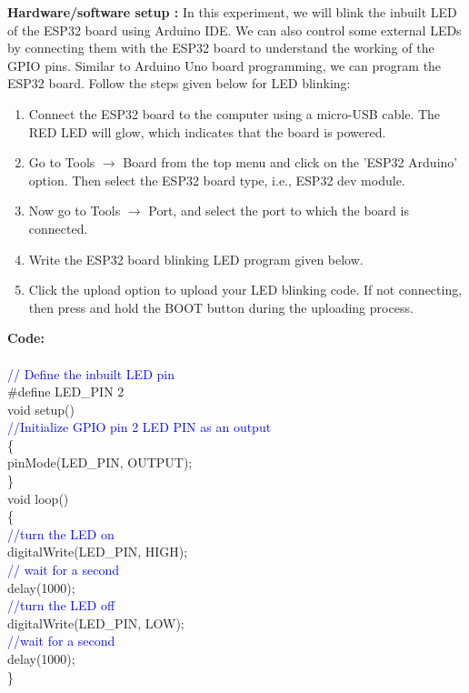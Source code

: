 \documentclass[12pt,a4paper]{article}
\begin{document}
\setlength{\parindent}{0eM}
\textbf{Hardware/software setup :} In this experiment, we will blink the inbuilt LED of the ESP32 board using Arduino IDE. We can also control some external LEDs by connecting them with the ESP32 board to understand the working of the GPIO pins. Similar to Arduino Uno board programming, we can program the ESP32 board.
Follow the steps given below for LED blinking:
\begin{enumerate}
 \setlength\itemsep{-0.3em}
 
\item {Connect the ESP32 board to the computer using a micro-USB cable. The RED LED will glow, which indicates that the board is powered.}

\item{Go to Tools $\rightarrow$ Board from the top menu and click on the 'ESP32 Arduino' option. Then select the ESP32 board type, i.e., ESP32 dev module.}

\item{Now go to Tools $\rightarrow$ Port, and select the port to which the board is connected.}

\item{Write the ESP32 board blinking LED program given below.}

\item{Click the upload option to upload your LED blinking code. If not connecting, then press and hold the BOOT button during the uploading process.}
\end{enumerate}


\hspace{2cm}\textbf{\large Code:}\\[6pt]

\setlength{\parindent}{10eM}\\

\textcolor{blue}{// Define the inbuilt LED pin}\\
\#define LED\_PIN 2 \\[3pt]
void setup() \\
\textcolor{blue}{//Initialize GPIO pin 2 LED PIN as an output}\\[3pt]
\{\\
pinMode(LED\_PIN, OUTPUT);\\
\}\\[3pt]
void loop()\\
\{\\
\textcolor{blue}{//turn the LED on}\\
digitalWrite(LED\_PIN, HIGH);\\
\textcolor{blue}{// wait for a second}\\
delay(1000);\\
\textcolor{blue}{//turn the LED off}\\
digitalWrite(LED\_PIN, LOW);\\
\textcolor{blue}{//wait for a second}\\
delay(1000);\\
\}\par
\end{document}
